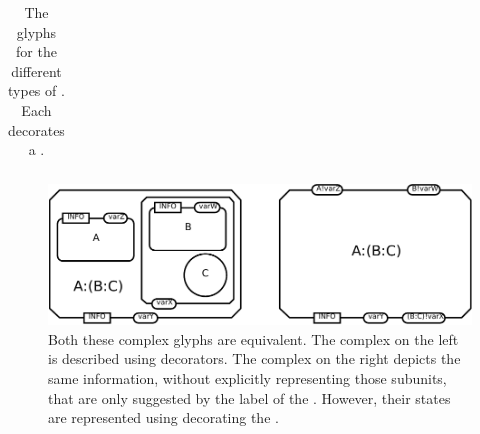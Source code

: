 \begin{table}[h]
\begin{tabu}{X[c,m]X[c,m]X[c,m]X[c,m]}
     & & & \\
    \bottomrule
\end{tabu}
\caption{The \PD glyphs for the different types of .
Each  decorates a .}
\label{tab:subunit_containers}
\end{table}


\begin{figure}[htb]
  \centering
  \includegraphics[scale=0.8]{images/build/complex.pdf}
  \caption{Both these complex glyphs are equivalent.
      The complex on the left is described using  decorators.
      The complex on the right depicts the same information, without explicitly representing those subunits, that are only suggested by the label of the .
      However, their states are represented using  decorating the .}
  \label{fig:complexSubunits}
\end{figure} 
